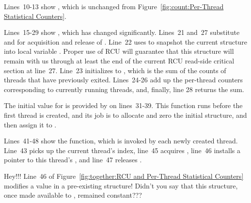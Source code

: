 Lines~10-13 show , which is unchanged from
Figure~\ref{fig:count:Per-Thread Statistical Counters}.

Lines~15-29 show , which has changed significantly.
Lines~21 and~27 substitute  and
 for acquisition and release of .
Line~22 uses  to snapshot the
current  structure into local variable .
Proper use of RCU will guarantee that this  structure
will remain with us through at least the end of the current RCU
read-side critical section at line~27.
Line~23 initializes  to , which is the
sum of the counts of threads that have previously exited.
Lines~24-26 add up the per-thread counters corresponding to currently
running threads, and, finally, line 28 returns the sum.

The initial value for  is
provided by  on lines~31-39.
This function runs before the first thread is created, and its job
is to allocate
and zero the initial structure, and then assign it to .

Lines~41-48 show the  function, which
is invoked by each newly created thread.
Line~43 picks up the current thread's index, line~45 acquires
, line~46 installs a pointer to this thread's
, and line~47 releases .

\QuickQuiz{}
	Hey!!!
	Line~46 of
	Figure~\ref{fig:together:RCU and Per-Thread Statistical Counters}
	modifies a value in a pre-existing  structure!
	Didn't you say that this structure, once made available to
	, remained constant???
 \QuickQuizEnd

